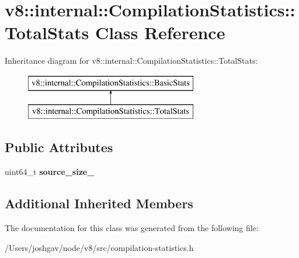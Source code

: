 \hypertarget{classv8_1_1internal_1_1_compilation_statistics_1_1_total_stats}{}\section{v8\+:\+:internal\+:\+:Compilation\+Statistics\+:\+:Total\+Stats Class Reference}
\label{classv8_1_1internal_1_1_compilation_statistics_1_1_total_stats}
Inheritance diagram for v8\+:\+:internal\+:\+:Compilation\+Statistics\+:\+:Total\+Stats\+:\begin{figure}[H]
\begin{center}
\leavevmode
\includegraphics[height=2.000000cm]{classv8_1_1internal_1_1_compilation_statistics_1_1_total_stats}
\end{center}
\end{figure}
\subsection*{Public Attributes}
\begin{DoxyCompactItemize}
\item 
uint64\+\_\+t {\bfseries source\+\_\+size\+\_\+}\hypertarget{classv8_1_1internal_1_1_compilation_statistics_1_1_total_stats_aff7d1cfadcbc8dcd5d2a078299ae3bfa}{}\label{classv8_1_1internal_1_1_compilation_statistics_1_1_total_stats_aff7d1cfadcbc8dcd5d2a078299ae3bfa}

\end{DoxyCompactItemize}
\subsection*{Additional Inherited Members}


The documentation for this class was generated from the following file\+:\begin{DoxyCompactItemize}
\item 
/\+Users/joshgav/node/v8/src/compilation-\/statistics.\+h\end{DoxyCompactItemize}
